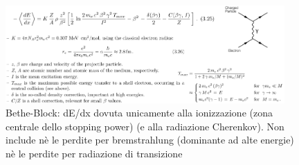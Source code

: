 \begin{figure}[H]
    \centering
    \includegraphics[width=0.95\textwidth,frame]{Chapters/images/Interazione_radiazione_materia/image-20220214173007634.png}
    \captionsetup{width=0.95\linewidth}
    \caption{Bethe-Block: dE/dx dovuta unicamente alla ionizzazione (zona centrale dello stopping power) (e alla radiazione Cherenkov). Non include nè le perdite per bremstrahlung (dominante ad alte energie) nè le perdite per radiazione di transizione}
    \label{fig:betheformula}
\end{figure}





